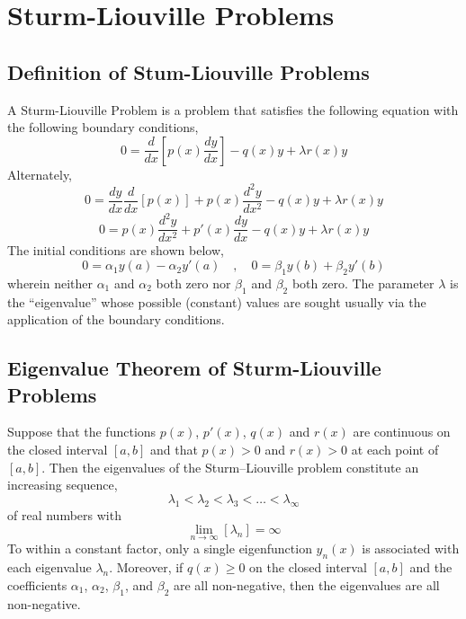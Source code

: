\chapter{Sturm-Liouville Problems}
\begin{comment}
\end{comment}
\section{Definition of Stum-Liouville Problems}
A Sturm-Liouville Problem is a problem that satisfies the following equation with the following boundary conditions,
$$0 = \frac{d}{dx}\left[p(x)\frac{dy}{dx}\right]-q(x)y+\lambda r(x)y$$
Alternately,
$$0 = \frac{dy}{dx}\frac{d}{dx}\left[p(x)\right] + p(x)\frac{d^2y}{dx^2}-q(x)y+\lambda r(x)y$$
$$0 = p(x)\frac{d^2y}{dx^2} + p'(x)\frac{dy}{dx}-q(x)y+\lambda r(x)y$$
The initial conditions are shown below,
$$0 = \alpha_1y(a) - \alpha_2y'(a)\quad,\quad 0 = \beta_1y(b) + \beta_2y'(b)$$
wherein neither $\alpha_1$ and $\alpha_2$ both zero nor $\beta_1$ and $\beta_2$ both zero. The parameter $\lambda$ is the “eigenvalue” whose possible (constant) values are sought usually via the application of the boundary conditions.    
\section{Eigenvalue Theorem of Sturm-Liouville Problems}
\begin{comment}
\end{comment}
Suppose that the functions $p(x)$, $p'(x)$, $q(x)$ and $r(x)$ are continuous on the closed interval $[a,b]$ and that $p(x)>0$ and $r(x)>0$ at each point of $[a,b]$. Then the eigenvalues of the Sturm–Liouville problem constitute an increasing sequence,
$$\lambda_1 < \lambda_2 < \lambda_3 < \dots <\lambda_\infty$$
of real numbers with
$$\lim_{n\to\infty}[\lambda_n] = \infty$$
To within a constant factor, only a single eigenfunction $y_n(x)$ is associated with each eigenvalue $\lambda_n$. Moreover, if $q(x)\geq0$ on the closed interval $[a,b]$ and the coefficients $\alpha_1$, $\alpha_2$, $\beta_1$, and $\beta_2$ are all non-negative, then the eigenvalues are all non-negative.
